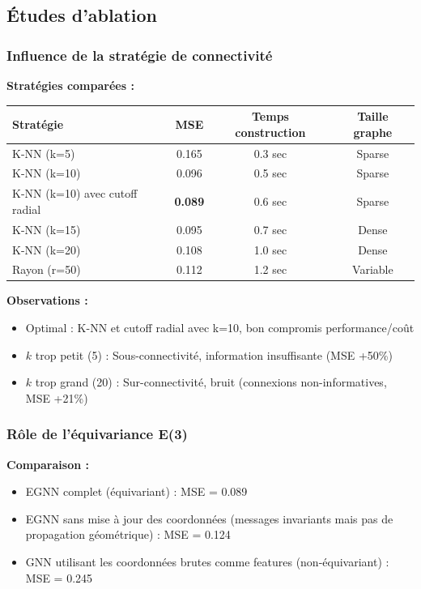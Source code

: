 \subsection{Études d'ablation}

\subsubsection{Influence de la stratégie de connectivité}

\textbf{Stratégies comparées :}

\begin{center}
\begin{tabular}{|l|c|c|c|}
\hline
\textbf{Stratégie} & \textbf{MSE} & \textbf{Temps construction} & \textbf{Taille graphe} \\
\hline
K-NN (k=5) & 0.165 & 0.3 sec & Sparse \\
K-NN (k=10) & 0.096 & 0.5 sec & Sparse \\
K-NN (k=10) avec cutoff radial & \textbf{0.089} & 0.6 sec & Sparse \\
K-NN (k=15) & 0.095 & 0.7 sec & Dense \\
K-NN (k=20) & 0.108 & 1.0 sec & Dense \\
Rayon (r=50) & 0.112 & 1.2 sec & Variable \\
\hline
\end{tabular}
\end{center}

\textbf{Observations :}
\begin{itemize}
    \item Optimal : K-NN et cutoff radial avec k=10, bon compromis performance/coût
    \item $k$ trop petit (5) : Sous-connectivité, information insuffisante (MSE +50\%)
    \item $k$ trop grand (20) : Sur-connectivité, bruit (connexions non-informatives, MSE +21\%)
\end{itemize}

\subsubsection{Rôle de l'équivariance E(3)}

\textbf{Comparaison :}
\begin{itemize}
    \item EGNN complet (équivariant) : MSE = 0.089
    \item EGNN sans mise à jour des coordonnées (messages invariants mais pas de propagation géométrique) : MSE = 0.124
    \item GNN utilisant les coordonnées brutes comme features (non-équivariant) : MSE = 0.245
\end{itemize}

